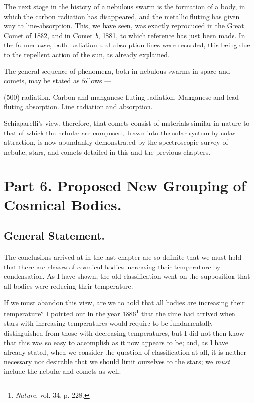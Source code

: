 \documentclass[a4paper, 12pt, oneside, polutonikogreek, english]{article}
\begin{document}
The next stage in the history of a nebulous swarm is the formation of a body, in which the carbon radiation has disappeared, and the metallic fluting has given way to line-absorption. This, we have seen, was exactly reproduced in the Great Comet of 1882, and in Comet \emph{b}, 1881, to which reference has just been made. In the former case, both radiation and absorption lines were recorded, this being due to the repellent action of the sun, as already explained.

The general sequence of phenomena, both in nebulous swarms in space and comets, may be stated as follows ---

(500) radiation. 
Carbon and manganese fluting radiation. 
Manganese and lead fluting absorption. 
Line radiation and absorption. 

Schiaparelli's view, therefore, that comets consist of materials similar in nature to that of which the nebulæ are composed, drawn into the solar system by solar attraction, is now abundantly demonstrated by the spectroscopic survey of nebulæ, stars, and comets detailed in this and the previous chapters.
\clearpage
\section{Part 6. Proposed New Grouping of Cosmical Bodies.}
\subsection{General Statement.}
\paragraph{}
The conclusions arrived at in the last chapter are so definite that we must hold that there are classes of cosmical bodies increasing their temperature by condensation. As I have shown, the old classification went on the supposition that all bodies were reducing their temperature.

If we must abandon this view, are we to hold that all bodies are increasing their temperature? I pointed out in the year 1886\footnote{\emph{Nature}, vol. 34. p. 228.} that the time had arrived when stars with increasing temperatures would require to be fundamentally distinguished from those with decreasing temperatures, but I did not then know that this was so easy to accomplish as it now appears to be; and, as I have already stated, when we consider the question of classification at all, it is neither necessary nor desirable that we should limit ourselves to the stars; we \emph{must} include the nebulæ and comets as well.
\end{document}
